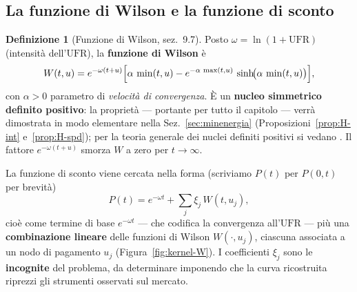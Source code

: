 \documentclass[11pt,a4paper]{article}
\theoremstyle{plain}
\theoremstyle{definition}
\newtheorem{definizione}[teorema]{Definizione}
\theoremstyle{remark}
\newcommand{\UFR}{\ensuremath{\mathrm{UFR}}}
\newcommand{\Qmat}{\mathbf{Q}}
\begin{document}
%
%

\subsection{La funzione di Wilson e la funzione di sconto}
\label{sub:kernel-W}

\begin{definizione}[Funzione di Wilson, \cite{eiopa2025} sez.~9.7]
Posto $\omega = \ln(1+\UFR)$ (intensit\`a dell'$\UFR$), la \textbf{funzione di Wilson} \`e
\[
  W(t,u) = e^{-\omega(t+u)}\Bigl[\alpha\,\min(t,u)
           - e^{-\alpha\,\max(t,u)}\,\sinh\!\bigl(\alpha\,\min(t,u)\bigr)\Bigr],
\]
con $\alpha>0$ parametro di \emph{velocit\`a di convergenza}. \`E un \textbf{nucleo simmetrico
definito positivo}: la propriet\`a --- portante per tutto il capitolo --- verr\`a dimostrata in modo
elementare nella Sez.~\ref{sec:minenergia} (Proposizioni~\ref{prop:H-int} e~\ref{prop:H-spd});
per la teoria generale dei nuclei definiti positivi si vedano \cite{fasshauer2007,lageras2016}.
Il fattore $e^{-\omega(t+u)}$ smorza $W$ a zero per
$t\to\infty$.%
\end{definizione}

La funzione di sconto viene cercata nella forma (scriviamo $P(t)$ per $P(0,t)$ per brevit\`a)
\begin{equation}
  P(t) = e^{-\omega t} + \textstyle\sum_{j} \xi_j\, W(t,u_j),
  \label{eq:sw-P-W}
\end{equation}
cio\`e come termine di base $e^{-\omega t}$ --- che codifica la convergenza all'$\UFR$ --- pi\`u
una \textbf{combinazione lineare} delle funzioni di Wilson $W(\cdot,u_j)$, ciascuna associata
a un nodo di pagamento $u_j$ (Figura~\ref{fig:kernel-W}). %
I coefficienti $\xi_j$
sono le \textbf{incognite} del problema, da determinare imponendo che la curva ricostruita
riprezzi gli strumenti osservati sul mercato.
\end{document}
